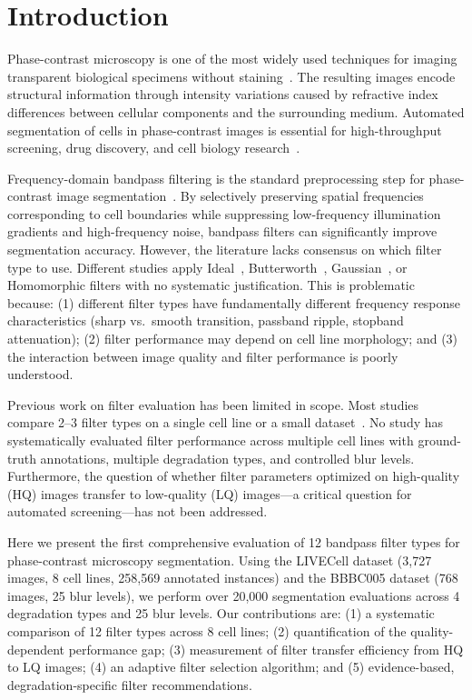 \documentclass[11pt,a4paper]{article}
\begin{document}
\section{Introduction}
\label{sec:intro}

Phase-contrast microscopy is one of the most widely used techniques for imaging transparent biological specimens without staining~\cite{zernike1942}. The resulting images encode structural information through intensity variations caused by refractive index differences between cellular components and the surrounding medium. Automated segmentation of cells in phase-contrast images is essential for high-throughput screening, drug discovery, and cell biology research~\cite{edlund2021livecell}.

Frequency-domain bandpass filtering is the standard preprocessing step for phase-contrast image segmentation~\cite{gonzalez2018digital}. By selectively preserving spatial frequencies corresponding to cell boundaries while suppressing low-frequency illumination gradients and high-frequency noise, bandpass filters can significantly improve segmentation accuracy. However, the literature lacks consensus on which filter type to use. Different studies apply Ideal~\cite{castleman1979}, Butterworth~\cite{lloyd1993}, Gaussian~\cite{bray2012}, or Homomorphic filters with no systematic justification. This is problematic because: (1) different filter types have fundamentally different frequency response characteristics (sharp vs.\ smooth transition, passband ripple, stopband attenuation); (2) filter performance may depend on cell line morphology; and (3) the interaction between image quality and filter performance is poorly understood.

Previous work on filter evaluation has been limited in scope. Most studies compare 2--3 filter types on a single cell line or a small dataset~\cite{castleman1979, gonzalez2018digital}. No study has systematically evaluated filter performance across multiple cell lines with ground-truth annotations, multiple degradation types, and controlled blur levels. Furthermore, the question of whether filter parameters optimized on high-quality (HQ) images transfer to low-quality (LQ) images---a critical question for automated screening---has not been addressed.

Here we present the first comprehensive evaluation of 12 bandpass filter types for phase-contrast microscopy segmentation. Using the LIVECell dataset (3,727 images, 8 cell lines, 258,569 annotated instances) and the BBBC005 dataset (768 images, 25 blur levels), we perform over 20,000 segmentation evaluations across 4 degradation types and 25 blur levels. Our contributions are: (1) a systematic comparison of 12 filter types across 8 cell lines; (2) quantification of the quality-dependent performance gap; (3) measurement of filter transfer efficiency from HQ to LQ images; (4) an adaptive filter selection algorithm; and (5) evidence-based, degradation-specific filter recommendations.
\end{document}
